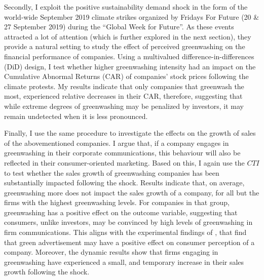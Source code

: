 \documentclass[12pt]{article}
\begin{document}
Secondly, I exploit the positive sustainability demand shock in the form of the world-wide September 2019 climate strikes organized by Fridays For Future (20 \& 27 September 2019) during the ``Global Week for Future''. As these events attracted a lot of attention (which is further explored in the next section), they provide a natural setting to study the effect of perceived greenwashing on the financial performance of companies. Using a multivalued difference-in-differences (DiD) design, I test whether higher greenwashing intensity had an impact on the Cumulative Abnormal Returns (CAR) of companies' stock prices following the climate protests. My results indicate that only companies that greenwash the most, experienced relative decreases in their CAR, therefore, suggesting that while extreme degrees of greenwashing may be penalized by investors, it may remain undetected when it is less pronounced.

Finally, I use the same procedure to investigate the effects on the growth of sales of the abovementioned companies. I argue that, if a company engages in greenwashing in their corporate communications, this behaviour will also be reflected in their consumer-oriented marketing. Based on this, I again use the $CTI$ to test whether the sales growth of greenwashing companies has been substantially impacted following the shock. Results indicate that, on average, greenwashing more does not impact the sales growth of a company, for all but the firms with the highest greenwashing levels. For companies in that group, greenwashing has a positive effect on the outcome variable, suggesting that consumers, unlike investors, may be convinced by high levels of greenwashing in firm communications. This aligns with the experimental findings of \textcite{schmuckMisleadingConsumersGreen2018,parguelCanEvokingNature2015}, that find that green advertisement may have a positive effect on consumer perception of a company. Moreover, the dynamic results show that firms engaging in greenwashing have experienced a small, and temporary increase in their sales growth following the shock. 
\end{document}
